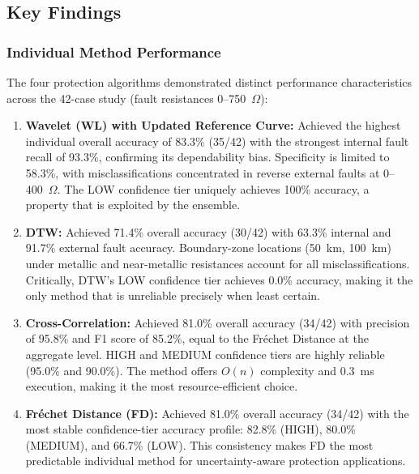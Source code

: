 \documentclass[journal]{IEEEtran}
\begin{document}
\subsection{Key Findings}

\subsubsection{Individual Method Performance}

The four protection algorithms demonstrated distinct performance
characteristics across the 42-case study (fault resistances
0--750~$\Omega$):

\begin{enumerate}
    \item \textbf{Wavelet (WL) with Updated Reference Curve:} Achieved
    the highest individual overall accuracy of 83.3\% (35/42) with the
    strongest internal fault recall of 93.3\%, confirming its
    dependability bias. Specificity is limited to 58.3\%, with
    misclassifications concentrated in reverse external faults at
    0--400~$\Omega$. The LOW confidence tier uniquely achieves 100\%
    accuracy, a property that is exploited by the ensemble.

    \item \textbf{DTW:} Achieved 71.4\% overall accuracy (30/42) with
    63.3\% internal and 91.7\% external fault accuracy. Boundary-zone
    locations (50~km, 100~km) under metallic and near-metallic
    resistances account for all misclassifications. Critically,
    DTW's LOW confidence tier achieves 0.0\% accuracy, making it
    the only method that is unreliable precisely when least certain.

    \item \textbf{Cross-Correlation:} Achieved 81.0\% overall accuracy
(34/42) with precision of 95.8\% and F1 score of 85.2\%, equal to
the Fr\'{e}chet Distance at the aggregate level. HIGH and MEDIUM
confidence tiers are highly reliable (95.0\% and 90.0\%). The method
offers $O(n)$ complexity and 0.3~ms execution, making it the most
resource-efficient choice.

    \item \textbf{Fr\'{e}chet Distance (FD):} Achieved 81.0\% overall
    accuracy (34/42) with the most stable confidence-tier accuracy
    profile: 82.8\% (HIGH), 80.0\% (MEDIUM), and 66.7\% (LOW). This
    consistency makes FD the most predictable individual method for
    uncertainty-aware protection applications.
\end{enumerate}
\end{document}
